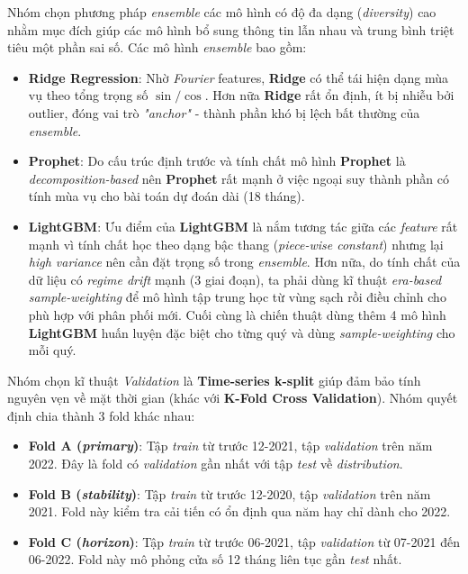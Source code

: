 \documentclass{article}
\begin{document}
Nhóm chọn phương pháp \textit{ensemble} các mô hình có độ đa dạng (\textit{diversity}) cao
nhằm mục đích giúp các mô hình bổ sung thông tin lẫn nhau và trung bình triệt tiêu một phần sai số. Các mô hình \textit{ensemble} bao gồm:
\begin{itemize}
    \item \textbf{Ridge Regression}: Nhờ \textit{Fourier} features, \textbf{Ridge} có thể tái hiện dạng mùa vụ theo tổng trọng số $\sin/\cos$. Hơn nữa \textbf{Ridge} rất ổn định, ít bị nhiễu bởi outlier, đóng vai trò \textit{"anchor"} - thành phần khó bị lệch bất thường của \textit{ensemble}.
    \item \textbf{Prophet}: Do cấu trúc định trước và tính chất mô hình \textbf{Prophet} là \textit{decomposition-based} nên \textbf{Prophet} rất mạnh ở việc ngoại suy thành phần có tính mùa vụ cho bài toán dự đoán dài (18 tháng).

    \item \textbf{LightGBM}: Ưu điểm của \textbf{LightGBM} là nắm tương tác giữa các \textit{feature} rất mạnh vì tính chất học theo dạng bậc thang (\textit{piece-wise constant}) nhưng lại \textit{high variance} nên cần đặt trọng số trong \textit{ensemble}. Hơn nữa, do tính chất của dữ liệu có \textit{regime drift} mạnh (3 giai đoạn), ta phải dùng kĩ thuật \textit{era-based sample-weighting} để mô hình tập trung học từ vùng sạch rồi điều chỉnh cho phù hợp với phân phối mới. Cuối cùng là chiến thuật dùng thêm 4 mô hình \textbf{LightGBM} huấn luyện đặc biệt cho từng quý và dùng \textit{sample-weighting} cho mỗi quý.
\end{itemize}

Nhóm chọn kĩ thuật \textit{Validation} là \textbf{Time-series k-split} giúp đảm bảo tính nguyên vẹn về mặt thời gian (khác với \textbf{K-Fold Cross Validation}). Nhóm quyết định chia thành 3 fold khác nhau:
\begin{itemize}
    \item \textbf{Fold A (\textit{primary})}: Tập \textit{train} từ trước 12-2021, tập \textit{validation} trên năm 2022. Đây là fold có \textit{validation} gần nhất với tập \textit{test} về \textit{distribution}.
    \item \textbf{Fold B (\textit{stability})}: Tập \textit{train} từ trước 12-2020, tập \textit{validation} trên năm 2021. Fold này kiểm tra cải tiến có ổn định qua năm hay chỉ dành cho 2022.
    \item \textbf{Fold C (\textit{horizon})}: Tập \textit{train} từ trước 06-2021, tập \textit{validation} từ 07-2021 đến 06-2022. Fold này mô phỏng cửa số 12 tháng liên tục gần \textit{test} nhất. 
\end{itemize}
\end{document}
